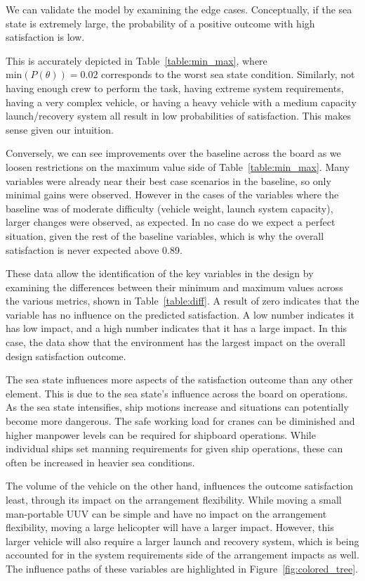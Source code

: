 \documentclass{svproc}
\begin{document}
We can validate the model by examining the edge cases. Conceptually, if the sea state is extremely large, the probability of a positive outcome with high satisfaction is low. 

This is accurately depicted in Table~\ref{table:min_max}, where $\text{min}(P(\theta)) = 0.02$ corresponds to the worst sea state condition. Similarly, not having enough crew to perform the task, having extreme system requirements, having a very complex vehicle, or having a heavy vehicle with a medium capacity launch/recovery system all result in low probabilities of satisfaction. This makes sense given our intuition. 

Conversely, we can see improvements over the baseline across the board as we loosen restrictions on the maximum value side of Table~\ref{table:min_max}. Many variables were already near their best case scenarios in the baseline, so only minimal gains were observed. However in the cases of the variables where the baseline was of moderate difficulty (vehicle weight, launch system capacity), larger changes were observed, as expected. In no case do we expect a perfect situation, given the rest of the baseline variables, which is why the overall satisfaction is never expected above 0.89. 

These data allow the identification of the key variables in the design by examining the differences between their minimum and maximum values across the various metrics, shown in Table~\ref{table:diff}. A result of zero indicates that the variable has no influence on the predicted satisfaction. A low number indicates it has low impact, and a high number indicates that it has a large impact. In this case, the data show that the environment has the largest impact on the overall design satisfaction outcome. 

The sea state influences more aspects of the satisfaction outcome than any other element. This is due to the sea state's influence across the board on operations. As the sea state intensifies, ship motions increase and situations can potentially become more dangerous. The safe working load for cranes can be diminished and higher manpower levels can be required for shipboard operations. While individual ships set manning requirements for given ship operations\cite{gayle_analysis_2006}, these can often be increased in heavier sea conditions. 

The volume of the vehicle on the other hand, influences the outcome satisfaction least, through its impact on the arrangement flexibility. While moving a small man-portable UUV can be simple and have no impact on the arrangement flexibility, moving a large helicopter will have a larger impact. However, this larger vehicle will also require a larger launch and recovery system, which is being accounted for in the system requirements side of the arrangement impacts as well. 
The influence paths of these variables are highlighted in Figure~\ref{fig:colored_tree}. 
\end{document}
